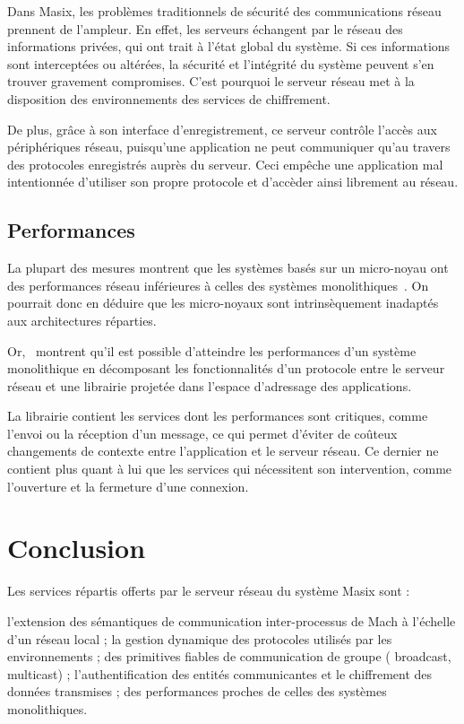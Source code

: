 Dans Masix, les probl\`emes traditionnels de s\'ecurit\'e des communications r\'eseau
prennent de l'ampleur.
En effet, les serveurs \'echangent par le r\'eseau des informations
priv\'ees, qui ont trait \`a l'\'etat global du syst\`eme. 
Si ces informations sont intercept\'ees ou alt\'er\'ees, 
la s\'ecurit\'e et l'int\'egrit\'e du syst\`eme peuvent s'en trouver gravement
compromises. C'est pourquoi le serveur r\'eseau met \`a la disposition des
environnements des services de chiffrement.

De plus, gr\^ace \`a son interface d'enregistrement, ce serveur
contr\^ole l'acc\`es aux p\'eriph\'eriques r\'eseau, 
puisqu'une application 
ne peut communiquer qu'au travers des protocoles enregistr\'es aupr\`es
du serveur. Ceci emp\^eche une application mal intentionn\'ee 
d'utiliser son propre protocole et d'acc\`eder ainsi librement au r\'eseau.

\subsection {Performances}

La plupart des mesures montrent que les syst\`emes
bas\'es sur un micro-noyau ont des performances r\'eseau inf\'erieures
\`a celles des syst\`emes monolithiques~\cite{Maeda92}. On
pourrait donc en d\'eduire que les micro-noyaux sont intrins\`equement
inadapt\'es aux architectures r\'eparties.

Or,~\cite{Maeda93} montrent qu'il est possible d'atteindre 
les performances d'un syst\`eme monolithique en d\'ecomposant les
fonctionnalit\'es d'un protocole entre le serveur r\'eseau et une librairie projet\'ee 
dans l'espace d'adressage des applications. 

La librairie contient 
les services dont les performances sont critiques, comme l'envoi ou 
la r\'eception d'un message, ce qui permet d'\'eviter de co\^uteux changements 
de contexte entre l'application et le serveur r\'eseau. Ce dernier ne contient
plus quant \`a lui que les services qui n\'ecessitent son intervention, comme
l'ouverture et la fermeture d'une connexion. 

\section {Conclusion}
Les services r\'epartis offerts par le serveur r\'eseau du syst\`eme Masix sont : 
\begin{itemize}
\myitem l'extension des s\'emantiques de communication inter-processus de Mach
\`a l'\'echelle d'un r\'eseau local ;
\myitem la gestion dynamique des protocoles utilis\'es par les environnements ;
\myitem des primitives fiables de communication de groupe (
broadcast, multicast) ;
\myitem l'authentification des entit\'es communicantes et le chiffrement des donn\'ees 
transmises ;
\myitem des performances proches de celles des syst\`emes monolithiques. 
\end{itemize}




